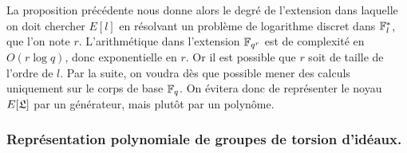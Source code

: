La proposition précédente nous donne alors le degré de l'extension dans laquelle on doit chercher $E[l]$ en résolvant un problème de logarithme discret dans $\mathbb{F}_{l}^{*}$, que l'on note $r$. L'arithmétique dans l'extension $\mathbb{F}_{q^{r}}$ est de complexité en $O(r\log q)$, donc exponentielle en $r$. Or il est possible que $r$ soit de taille de l'ordre de $l$. Par la suite, on voudra dès que possible mener des calculs uniquement sur le corps de base $\mathbb{F}_{q}$. On évitera donc de représenter le noyau $E[\mathfrak{L}]$ par un générateur, mais plutôt par un polynôme.


\subsubsection{Représentation polynomiale de groupes de torsion d'idéaux.}\label{SECTION méthodeElkies}

